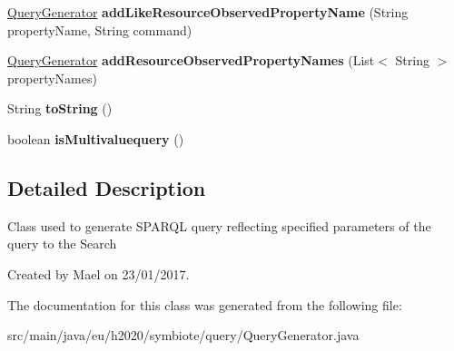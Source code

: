 \begin{DoxyCompactItemize}
\item 
\hyperlink{classeu_1_1h2020_1_1symbiote_1_1query_1_1QueryGenerator}{Query\+Generator} {\bfseries add\+Like\+Resource\+Observed\+Property\+Name} (String property\+Name, String command)\hypertarget{classeu_1_1h2020_1_1symbiote_1_1query_1_1QueryGenerator_a69e76d3e08335d404ec0af8626c58e2c}{}\label{classeu_1_1h2020_1_1symbiote_1_1query_1_1QueryGenerator_a69e76d3e08335d404ec0af8626c58e2c}

\item 
\hyperlink{classeu_1_1h2020_1_1symbiote_1_1query_1_1QueryGenerator}{Query\+Generator} {\bfseries add\+Resource\+Observed\+Property\+Names} (List$<$ String $>$ property\+Names)\hypertarget{classeu_1_1h2020_1_1symbiote_1_1query_1_1QueryGenerator_a925f75c04a7e608619882dc683d60b1c}{}\label{classeu_1_1h2020_1_1symbiote_1_1query_1_1QueryGenerator_a925f75c04a7e608619882dc683d60b1c}

\item 
String {\bfseries to\+String} ()\hypertarget{classeu_1_1h2020_1_1symbiote_1_1query_1_1QueryGenerator_a1b90b36cb12b3e63d485eccac837d6d0}{}\label{classeu_1_1h2020_1_1symbiote_1_1query_1_1QueryGenerator_a1b90b36cb12b3e63d485eccac837d6d0}

\item 
boolean {\bfseries is\+Multivaluequery} ()\hypertarget{classeu_1_1h2020_1_1symbiote_1_1query_1_1QueryGenerator_a330e5262e01af4a187fc754529285f0d}{}\label{classeu_1_1h2020_1_1symbiote_1_1query_1_1QueryGenerator_a330e5262e01af4a187fc754529285f0d}

\end{DoxyCompactItemize}


\subsection{Detailed Description}
Class used to generate S\+P\+A\+R\+QL query reflecting specified parameters of the query to the Search

Created by Mael on 23/01/2017. 

The documentation for this class was generated from the following file\+:\begin{DoxyCompactItemize}
\item 
src/main/java/eu/h2020/symbiote/query/Query\+Generator.\+java\end{DoxyCompactItemize}
